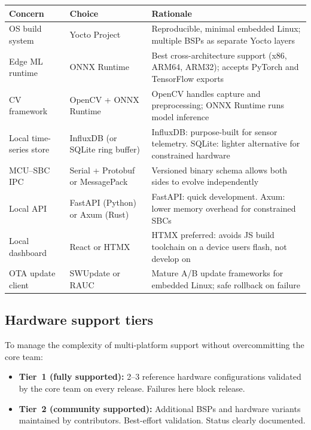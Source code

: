 \begin{center}
\begin{tabular}{p{3.5cm}p{4cm}p{5.5cm}}
\toprule
\textbf{Concern} & \textbf{Choice} & \textbf{Rationale} \\
\midrule
OS build system & Yocto Project & Reproducible, minimal embedded Linux; multiple BSPs as separate Yocto layers \\
Edge ML runtime & ONNX Runtime & Best cross-architecture support (x86, ARM64, ARM32); accepts PyTorch and TensorFlow exports \\
CV framework & OpenCV + ONNX Runtime & OpenCV handles capture and preprocessing; ONNX Runtime runs model inference \\
Local time-series store & InfluxDB (or SQLite ring buffer) & InfluxDB: purpose-built for sensor telemetry. SQLite: lighter alternative for constrained hardware \\
MCU--SBC IPC & Serial + Protobuf or MessagePack & Versioned binary schema allows both sides to evolve independently \\
Local API & FastAPI (Python) or Axum (Rust) & FastAPI: quick development. Axum: lower memory overhead for constrained SBCs \\
Local dashboard & React or HTMX & HTMX preferred: avoids JS build toolchain on a device users flash, not develop on \\
OTA update client & SWUpdate or RAUC & Mature A/B update frameworks for embedded Linux; safe rollback on failure \\
\bottomrule
\end{tabular}
\end{center}

\subsection{Hardware support tiers}\label{sec:hardware-tiers}

To manage the complexity of multi-platform support without overcommitting the core team:

\begin{itemize}
  \item \textbf{Tier~1 (fully supported):} 2--3 reference hardware configurations validated by the core team on every release. Failures here block release.
  \item \textbf{Tier~2 (community supported):} Additional BSPs and hardware variants maintained by contributors. Best-effort validation. Status clearly documented.
\end{itemize}

